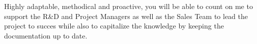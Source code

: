 \documentclass[11pt, a4paper]{awesome-cv}
\begin{document}
\begin{cvletter}
Highly adaptable, methodical and proactive, you will be able to count on me to support the R\&D and Project Managers as well as the Sales Team
to lead the project to succes while also to capitalize the knowledge by keeping the documentation up to date. 




\end{cvletter}

\makeletterclosing
\end{document}
